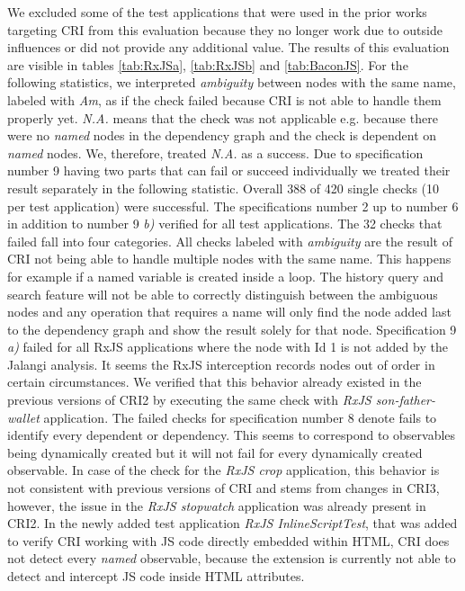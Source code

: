 We excluded some of the test applications that were used in the prior works targeting CRI from this evaluation because they no longer work due to outside influences or did not provide any additional value. The results of this evaluation are visible in tables \ref{tab:RxJSa}, \ref{tab:RxJSb} and \ref{tab:BaconJS}. For the following statistics, we interpreted \emph{ambiguity} between nodes with the same name, labeled with \emph{Am}, as if the check failed because CRI is not able to handle them properly yet. \emph{N.A.} means that the check was not applicable e.g. because there were no \emph{named} nodes in the dependency graph and the check is dependent on \emph{named} nodes. We, therefore, treated \emph{N.A.} as a success. Due to specification number 9 having two parts that can fail or succeed individually we treated their result separately in the following statistic. Overall 388 of 420 single checks (10 per test application) were successful. The specifications number 2 up to number 6 in addition to number 9 \emph{b)} verified for all test applications. The 32 checks that failed fall into four categories. All checks labeled with \emph{ambiguity} are the result of CRI not being able to handle multiple nodes with the same name. This happens for example if a named variable is created inside a loop. The history query and search feature will not be able to correctly distinguish between the ambiguous nodes and any operation that requires a name will only find the node added last to the dependency graph and show the result solely for that node. Specification 9 \emph{a)} failed for all RxJS applications where the node with Id 1 is not added by the Jalangi analysis. It seems the RxJS interception records nodes out of order in certain circumstances. We verified that this behavior already existed in the previous versions of CRI2 by executing the same check with \emph{RxJS son-father-wallet} application. The failed checks for specification number 8 denote fails to identify every dependent or dependency. This seems to correspond to observables being dynamically created but it will not fail for every dynamically created observable. In case of the check for the \emph{RxJS crop} application, this behavior is not consistent with previous versions of CRI and stems from changes in CRI3, however, the issue in the \emph{RxJS stopwatch} application was already present in CRI2.
In the newly added test application \emph{RxJS InlineScriptTest}, that was added to verify CRI working with JS code directly embedded within HTML, CRI does not detect every \emph{named} observable, because the extension is currently not able to detect and intercept JS code inside HTML attributes.
